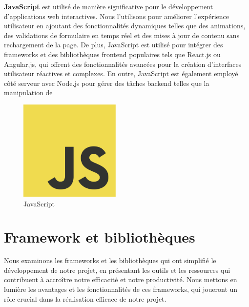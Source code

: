 \textbf{JavaScript} est utilisé de manière significative pour le développement d'applications web interactives. Nous l'utilisons pour améliorer l'expérience utilisateur en ajoutant des fonctionnalités dynamiques telles que des animations, des validations de formulaire en temps réel et des mises à jour de contenu sans rechargement de la page. De plus, JavaScript est utilisé pour intégrer des frameworks et des bibliothèques frontend populaires tels que React.js ou Angular.js, qui offrent des fonctionnalités avancées pour la création d'interfaces utilisateur réactives et complexes. En outre, JavaScript est également employé côté serveur avec Node.js pour gérer des tâches backend telles que la manipulation de
\\
\begin{figure}[H]
    \centering
    \includegraphics[width=5cm]{Figures/javascript.png}
    \caption{JavaScript}
\end{figure}






\section{Framework et bibliothèques}

\hspace{\parindent}Nous examinons les frameworks et les bibliothèques qui ont simplifié le développement de notre projet, en présentant les outils et les ressources qui contribuent à accroître notre efficacité et notre productivité. Nous mettons en lumière les avantages et les fonctionnalités de ces frameworks, qui joueront un rôle crucial dans la réalisation efficace de notre projet.

